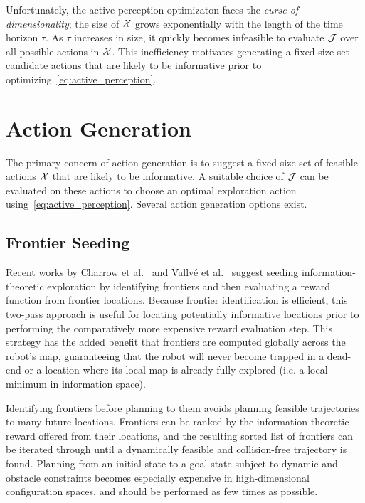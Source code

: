 Unfortunately, the active perception optimizaton faces the \textit{curse of dimensionality};
the size of $\mathcal{X}$ grows exponentially with the length of the time horizon $\tau$.
As $\tau$ increases in size, it quickly becomes infeasible to evaluate $\mathcal{J}$ over all
possible actions in $\mathcal{X}$. This inefficiency motivates generating a
fixed-size set candidate actions that are likely to be informative prior to optimizing~\eqref{eq:active_perception}.

\section{Action Generation}
\label{sec:action_generation}

The primary concern of action generation is to suggest a fixed-size set of feasible actions
$\mathcal{X}$ that are likely to be informative. A suitable choice of $\mathcal{J}$ can be
evaluated on these actions to choose an optimal exploration action
using~\eqref{eq:active_perception}. Several
action generation options exist.

\subsection{Frontier Seeding}
\label{subsec:frontier_seeding}

Recent works by Charrow et al.~\cite{charrow2015icra} and Vallv\'{e} et
al.~\cite{vallve2014dense} suggest seeding
information-theoretic exploration by identifying frontiers and then evaluating
a reward function from frontier locations. Because frontier
identification is efficient, this two-pass approach is useful for locating
potentially informative locations prior to performing the comparatively more
expensive reward evaluation step. This strategy has the added benefit that frontiers are computed
globally across the robot's map, guaranteeing that the robot will never become
trapped in a dead-end or a location where its local map is already fully
explored (i.e. a local minimum in information space).

Identifying frontiers before planning to them avoids planning feasible
trajectories to many future locations. Frontiers can be ranked by the
information-theoretic reward offered from their locations, and the resulting sorted list
of frontiers can be iterated through until a dynamically feasible and
collision-free trajectory is found. Planning from an initial state to a goal state
subject to dynamic and obstacle constraints becomes especially expensive in
high-dimensional configuration spaces, and should be performed as few times as possible.

